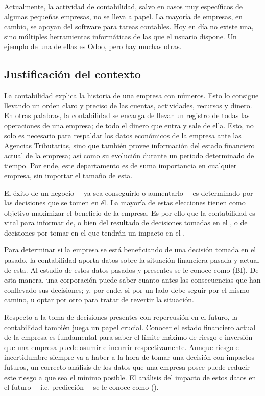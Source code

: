 Actualmente, la actividad de contabilidad, salvo en casos muy específicos de algunas pequeñas empresas, no se lleva a papel. La mayoría de empresas, en cambio, se apoyan del software para tareas contables. Hoy en día no existe una, sino múltiples herramientas informáticas de las que el usuario dispone. Un ejemplo de una de ellas es Odoo, pero hay muchas otras.

\subsection{Justificación del contexto}
La contabilidad explica la historia de una empresa con números. Esto lo consigue llevando un orden claro y preciso de las cuentas, actividades, recursos y dinero. En otras palabras, la contabilidad se encarga de llevar un registro de todas las operaciones de una empresa; de todo el dinero que entra y sale de ella. Esto, no solo es necesario para respaldar los datos económicos de la empresa ante las Agencias Tributarias, sino que también provee información del estado financiero actual de la empresa; así como su evolución durante un periodo determinado de tiempo. Por ende, este departamento es de suma importancia en cualquier empresa, sin importar el tamaño de esta.

El éxito de un negocio ---ya sea conseguirlo o aumentarlo--- es determinado por las decisiones que se tomen en él. La mayoría de estas elecciones tienen como objetivo maximizar el beneficio de la empresa. Es por ello que la contabilidad es vital para informar de, o bien del resultado de decisiones tomadas en el , o de decisiones por tomar en el  que tendrán un impacto en el .

Para determinar si la empresa se está beneficiando de una decisión tomada en el pasado, la contabilidad aporta datos sobre la situación financiera pasada y actual de esta. Al estudio de estos datos pasados y presentes se le conoce como  (BI). De esta manera, una corporación puede saber cuanto antes las consecuencias que han conllevado sus decisiones; y, por ende, si por un lado debe seguir por el mismo camino, u optar por otro para tratar de revertir la situación.

Respecto a la toma de decisiones presentes con repercusión en el futuro, la contabilidad también juega un papel crucial. Conocer el estado financiero actual de la empresa es fundamental para saber el límite máximo de riesgo e inversión que una empresa puede asumir e incurrir respectivamente. Aunque riesgo e incertidumbre siempre va a haber a la hora de tomar una decisión con impactos futuros, un correcto análisis de los datos que una empresa posee puede reducir este riesgo a que sea el mínimo posible. El análisis del impacto de estos datos en el futuro ---i.e. predicción--- se le conoce como  ().

